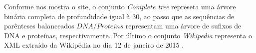 \begin{table}[h!]
  \centering
  \caption[Conjunto de dados usados em testes experimetais]{Conjunto de dados usados nos testes experimetais }
  \label{tbl:dataset}
\end{table}

Conforme nos mostra o site, o  conjunto \textit{Complete tree} represeta uma árvore binária completa de profundidade igual à 30, ao passo que as sequências  de parênteses balanceados $DNA$/$Proteins$ representam uma árvore de sufixos de DNA e proteínas, respectivamente. Por último o conjunto \textit{Wikipedia} representa o XML extraído da Wikipédia no dia 12 de janeiro de 2015 \citep{datasets-inf-udec}.

